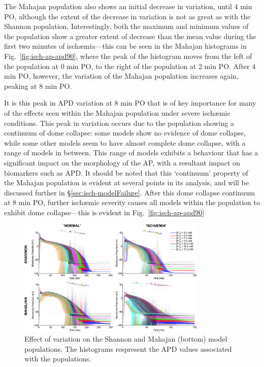\documentclass[../thesis-main.tex]{subfiles}
\begin{document}
The Mahajan population also shows an initial decrease in variation, until 4 min PO, although the extent of the decrease in variation is not as great as with the Shannon population. Interestingly, both the maximum and minimum values of the population show a greater extent of decrease than the mean value during the first two minutes of isch\ae{}mia---this can be seen in the Mahajan histograms in Fig.~\ref{fig:isch-ap-apd90}, where the peak of the histogram moves from the left of the population at 0 min PO, to the right of the population at 2 min PO. After 4 min PO, however, the variation of the Mahajan population increases again, peaking at 8 min PO.

It is this peak in APD variation at 8 min PO that is of key importance for many of the effects seen within the Mahajan population under severe isch\ae{}mic conditions. This peak in variation occurs due to the population showing a continuum of dome collapse: some models show no evidence of dome collapse, while some other models seem to have almost complete dome collapse, with a range of models in between.  This range of models exhibits a behaviour that has a significant impact on the morphology of the AP, with a resultant impact on biomarkers such as APD. It should be noted that this `continuum' property of the Mahajan population is evident at several points in its analysis, and will be discussed further in \S\ref{sec:isch-modelFailure}. After this dome collapse continuum at 8 min PO, further isch\ae{}mic severity causes all models within the population to exhibit dome collapse---this is evident in Fig.~\ref{fig:isch-ap-apd90}

\begin{figure}
 \centering
 \includegraphics[width=0.8\textwidth]{ko_isch17-ap-full}
 \caption[Effect of \ko{} variation on the Shannon and Mahajan model populations.]{Effect of \ko{} variation on the Shannon and Mahajan (bottom) model populations. The histograms respresent the APD values associated with the populations.}
 \label{fig:ko_isch17-ap}
\end{figure}
\end{document}
